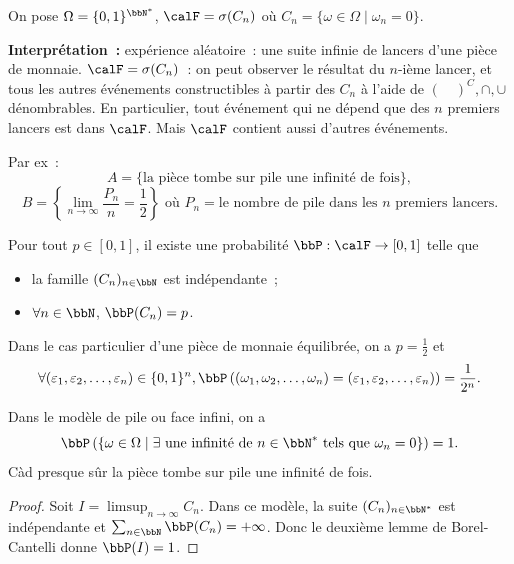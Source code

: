 \begin{exem}
    On pose $\Omega = \{ 0, 1 \}^{\bbN^*}$, $\calF = \sigma(C_n)$ où $C_n = \{ \omega \in \Omega \mid \omega_n = 0 \}$.

    \textbf{Interprétation~:} expérience aléatoire~: une suite infinie de lancers d'une pièce de monnaie.
    $\calF = \sigma(C_n)$~: on peut observer le résultat du $n$-ième lancer,
    et tous les autres événements constructibles à partir des $C_n$ à l'aide de $(\quad)^C, \cap, \cup$ dénombrables.
    En particulier, tout événement qui ne dépend que des $n$ premiers lancers est dans $\calF$.
    Mais $\calF$ contient aussi d'autres événements.

    Par ex~:
    \[ A = \{ \text{la pièce tombe sur pile une infinité de fois} \}, \]
    \[ B = \left\{ \lim_{n \to \infty} \frac{P_n}{n} = \frac{1}{2} \right\}
        \text{ où } P_n = \text{le nombre de pile dans les } n \text{ premiers lancers}. \]
\end{exem}

\begin{thm}
    Pour tout $p \in [0, 1]$, il existe une probabilité $\bbP: \calF \to [0, 1]$ telle que
    \begin{itemize}
        \item la famille $(C_n)_{n \in \bbN}$ est indépendante~;
        \item $\forall n \in \bbN$, $\bbP(C_n) = p$.
    \end{itemize}

    Dans le cas particulier d'une pièce de monnaie équilibrée, on a $p = \frac{1}{2}$ et
    \[ \forall (\varepsilon_1, \varepsilon_2, \ldots, \varepsilon_n) \in \{ 0, 1 \}^n,
        \bbP\left((\omega_1, \omega_2, \ldots, \omega_n) = (\varepsilon_1, \varepsilon_2, \ldots, \varepsilon_n)\right)
        = \frac{1}{2^n}. \]
\end{thm}

\begin{prop}
    Dans le modèle de pile ou face infini, on a
    \[ \bbP\left(\{ \omega \in \Omega \mid \exists \text{ une infinité de } n \in \bbN^* \text{ tels que } \omega_n = 0 \}\right) = 1. \]
    Càd presque sûr la pièce tombe sur pile une infinité de fois.
\end{prop}

\begin{proof}
    Soit $I = \limsup_{n \to \infty} C_n$.
    Dans ce modèle, la suite $(C_n)_{n \in \bbN^*}$ est indépendante et $\sum_{n \in \bbN} \bbP(C_n) = +\infty$.
    Donc le deuxième lemme de Borel-Cantelli donne $\bbP(I) = 1$.
\end{proof}
